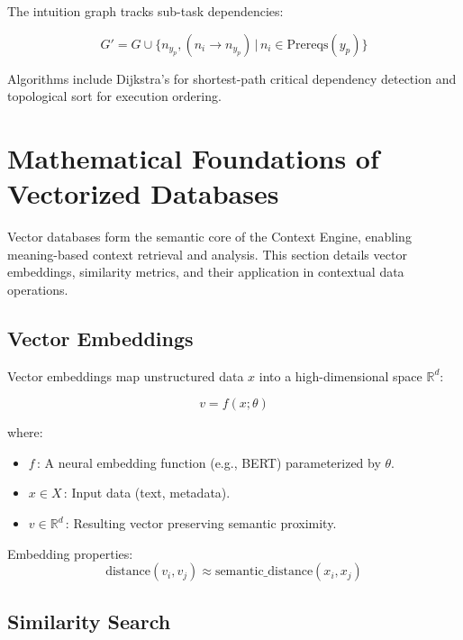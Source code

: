 \documentclass[11pt]{article}
\begin{document}
The intuition graph tracks sub-task dependencies:

\[
G' = G \cup \{n_{y_p}, (n_i\!\rightarrow\!n_{y_p})\,|\,n_i\in\text{Prereqs}(y_p)\}
\]

Algorithms include Dijkstra’s for shortest-path critical dependency detection and topological sort for execution ordering.

\section{Mathematical Foundations of Vectorized Databases}
\label{sec:math}

Vector databases form the semantic core of the Context Engine, enabling meaning-based context retrieval and analysis. This section details vector embeddings, similarity metrics, and their application in contextual data operations.

\subsection{Vector Embeddings}
\label{subsec:embeddings}

Vector embeddings map unstructured data \(x\) into a high-dimensional space \(\mathbb{R}^d\):

\[
v = f(x; \theta)
\]

where:
\begin{itemize}
  \item \(f\)\,: A neural embedding function (e.g., BERT) parameterized by \(\theta\).
  \item \(x\in X\)\,: Input data (text, metadata).
  \item \(v\in\mathbb{R}^d\)\,: Resulting vector preserving semantic proximity.
\end{itemize}

Embedding properties:
\[
\text{distance}(v_i, v_j)\approx\text{semantic\_distance}(x_i,x_j)
\]

\subsection{Similarity Search}
\label{subsec:similarity_search}
\end{document}

